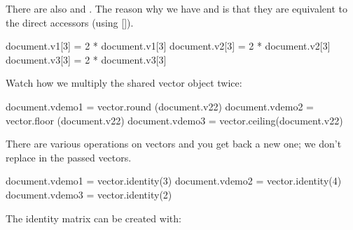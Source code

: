 \startlinecorrection
{} {} {\hbox{\tt {}}} {}
  {} {} {\hbox{\tt {}}} {}
  {} {} {\hbox{\tt {}}} {}
\stopcombination
\stoplinecorrection

There are also  and . The reason why we have 
and  is that they are equivalent to the direct accessors (using \type
{[]}).

\startbuffer
\startluacode
document.v1[3] = 2 * document.v1[3]
document.v2[3] = 2 * document.v2[3]
document.v3[3] = 2 * document.v3[3]
\stopluacode
\stopbuffer

\typebuffer[option=TEX] \getbuffer

Watch how we multiply the shared vector object twice:

\startlinecorrection %
 {} {\hbox{\tt {}}} {}
  {} {} {\hbox{\tt {}}} {}
  {} {} {\hbox{\tt {}}} {}
\stopcombination
\stoplinecorrection

\startbuffer
\startluacode
document.vdemo1 = vector.round  (document.v22)
document.vdemo2 = vector.floor  (document.v22)
document.vdemo3 = vector.ceiling(document.v22)
\stopluacode
\stopbuffer

\typebuffer[option=TEX] \getbuffer

There are various operations on vectors and you get back a new one; we don't
replace in the passed vectors.

\startlinecorrection
{} {}
  {} {\hbox{}}
  {} {\hbox{}}
  {} {\hbox{}}
\stopcombination
\stoplinecorrection

\startbuffer
\startluacode
document.vdemo1 = vector.identity(3)
document.vdemo2 = vector.identity(4)
document.vdemo3 = vector.identity(2)
\stopluacode
\stopbuffer

The identity matrix can be created with:

